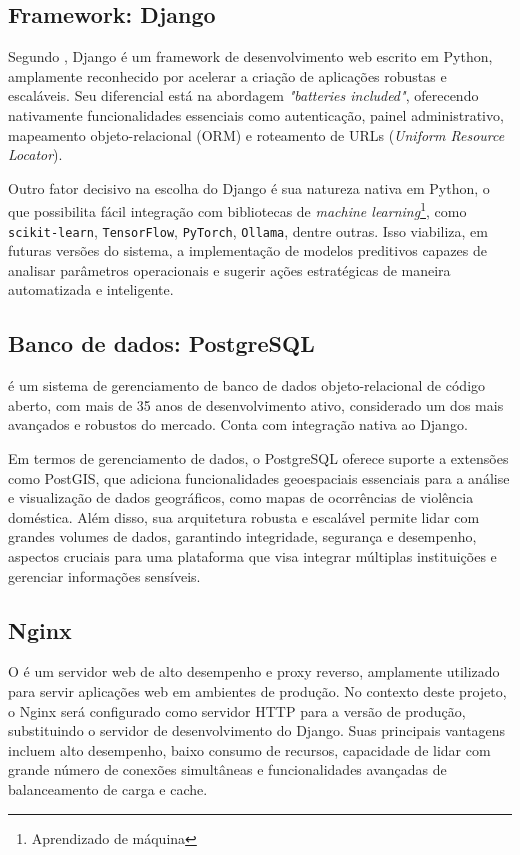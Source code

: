 \subsection{Framework: Django}
\par Segundo , Django é um framework de desenvolvimento web escrito em Python, amplamente reconhecido por acelerar a criação de aplicações robustas e escaláveis. Seu diferencial está na abordagem \textit{"batteries included"}, oferecendo nativamente funcionalidades essenciais como autenticação, painel administrativo, mapeamento objeto-relacional (ORM) e roteamento de URLs (\textit{Uniform Resource Locator}).
\par Outro fator decisivo na escolha do Django é sua natureza nativa em Python, o que possibilita fácil integração com bibliotecas de \textit{machine learning}\footnote{Aprendizado de máquina}, como \texttt{scikit-learn}, \texttt{TensorFlow}, \texttt{PyTorch}, \texttt{Ollama}, dentre outras. Isso viabiliza, em futuras versões do sistema, a implementação de modelos preditivos capazes de analisar parâmetros operacionais e sugerir ações estratégicas de maneira automatizada e inteligente.

\subsection{Banco de dados: PostgreSQL}
\par {} é um sistema de gerenciamento de banco de dados objeto-relacional de código aberto, com mais de 35 anos de desenvolvimento ativo, considerado um dos mais avançados e robustos do mercado. Conta com integração nativa ao Django.
\par Em termos de gerenciamento de dados, o PostgreSQL oferece suporte a extensões como PostGIS, que adiciona funcionalidades geoespaciais essenciais para a análise e visualização de dados geográficos, como mapas de ocorrências de violência doméstica. Além disso, sua arquitetura robusta e escalável permite lidar com grandes volumes de dados, garantindo integridade, segurança e desempenho, aspectos cruciais para uma plataforma que visa integrar múltiplas instituições e gerenciar informações sensíveis.

\subsection{Nginx}
\par O  é um servidor web de alto desempenho e proxy reverso, amplamente utilizado para servir aplicações web em ambientes de produção. No contexto deste projeto, o Nginx será configurado como servidor HTTP para a versão de produção, substituindo o servidor de desenvolvimento do Django. Suas principais vantagens incluem alto desempenho, baixo consumo de recursos, capacidade de lidar com grande número de conexões simultâneas e funcionalidades avançadas de balanceamento de carga e cache.

